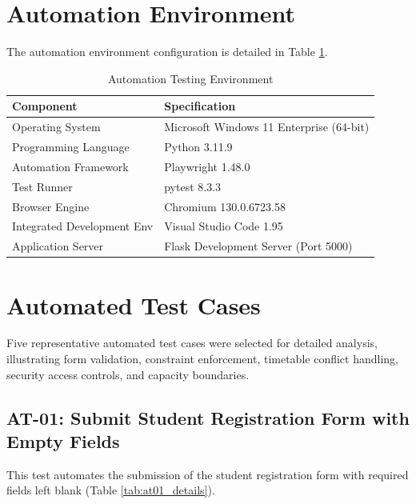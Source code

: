 \documentclass{InternshipReport}
\begin{document}
\section{Automation Environment}
The automation environment configuration is detailed in Table \ref{tab:automation_env}.

\begin{table}[H]
\centering
\caption{Automation Testing Environment}
\label{tab:automation_env}
\begin{tabular}{p{} p{}}
\toprule
\textbf{Component} & \textbf{Specification} \\
\midrule
Operating System & Microsoft Windows 11 Enterprise (64-bit) \\
Programming Language & Python 3.11.9 \\
Automation Framework & Playwright 1.48.0 \\
Test Runner & pytest 8.3.3 \\
Browser Engine & Chromium 130.0.6723.58 \\
Integrated Development Env & Visual Studio Code 1.95 \\
Application Server & Flask Development Server (Port 5000) \\
\bottomrule
\end{tabular}
\end{table}

\section{Automated Test Cases}
Five representative automated test cases were selected for detailed analysis, illustrating form validation, constraint enforcement, timetable conflict handling, security access controls, and capacity boundaries.

\subsection{AT-01: Submit Student Registration Form with Empty Fields}
This test automates the submission of the student registration form with required fields left blank (Table \ref{tab:at01_details}).
\end{document}
